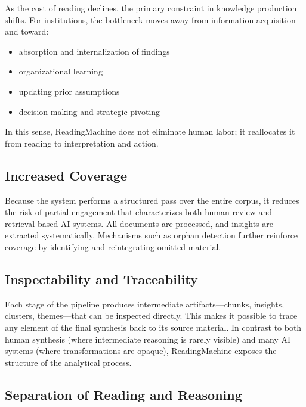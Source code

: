 \documentclass[
  11pt,
]{article}
\providecommand{\tightlist}{%
  \setlength{\itemsep}{0pt}\setlength{\parskip}{0pt}}
\begin{document}
As the cost of reading declines, the primary constraint in knowledge
production shifts. For institutions, the bottleneck moves away from
information acquisition and toward:

\begin{itemize}
\tightlist
\item
  absorption and internalization of findings\\
\item
  organizational learning\\
\item
  updating prior assumptions\\
\item
  decision-making and strategic pivoting
\end{itemize}

In this sense, ReadingMachine does not eliminate human labor; it
reallocates it from reading to interpretation and action.

\subsection{Increased Coverage}\label{increased-coverage}

Because the system performs a structured pass over the entire corpus, it
reduces the risk of partial engagement that characterizes both human
review and retrieval-based AI systems. All documents are processed, and
insights are extracted systematically. Mechanisms such as orphan
detection further reinforce coverage by identifying and reintegrating
omitted material.

\subsection{Inspectability and
Traceability}\label{inspectability-and-traceability}

Each stage of the pipeline produces intermediate artifacts---chunks,
insights, clusters, themes---that can be inspected directly. This makes
it possible to trace any element of the final synthesis back to its
source material. In contrast to both human synthesis (where intermediate
reasoning is rarely visible) and many AI systems (where transformations
are opaque), ReadingMachine exposes the structure of the analytical
process.

\subsection{Separation of Reading and
Reasoning}\label{separation-of-reading-and-reasoning}
\end{document}
